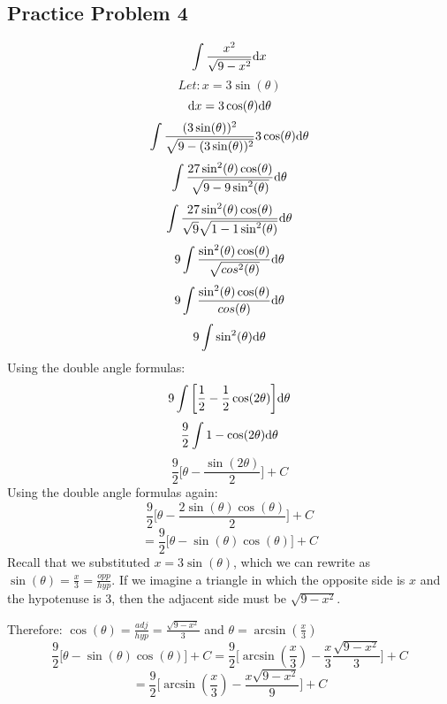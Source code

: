 \documentclass{math}
\begin{document}
\subsection*{Practice Problem 4}
\[ \int{\frac{x^{2}}{\sqrt{9-x^{2}}}\mathrm{d}{x}} \]
\[ Let: x = 3\sin(\theta) \]
\[ \mathrm{d}{x} = 3\cos(\theta)\mathrm{d}{\theta} \]
\[ \int{\frac{(3\sin(\theta))^{2}}
   {\sqrt{9-(3\sin(\theta))^{2}}}3\cos(\theta)\mathrm{d}{\theta}} \]
\[ \int{\frac{27\sin^{2}(\theta)\cos(\theta)}
   {\sqrt{9-9\sin^{2}(\theta)}}\mathrm{d}{\theta}} \]
\[ \int{\frac{27\sin^{2}(\theta)\cos(\theta)}
   {\sqrt{9}\sqrt{1-1\sin^{2}(\theta)}}\mathrm{d}{\theta}} \]
\[ 9\int{\frac{\sin^{2}(\theta)\cos(\theta)}
   {\sqrt{cos^{2}(\theta)}}\mathrm{d}{\theta}} \]
\[ 9\int{\frac{\sin^{2}(\theta)\cos(\theta)}{cos(\theta)}\mathrm{d}{\theta}} \]
\[ 9\int{\sin^{2}(\theta)\mathrm{d}{\theta}} \]
Using the double angle formulas:
\[ 9\int{\bigg[\frac{1}{2}-\frac{1}{2}\cos(2\theta)\bigg]\mathrm{d}{\theta}} \]
\[ \frac{9}{2}\int{1-\cos(2\theta)\mathrm{d}{\theta}} \]
\[ \frac{9}{2}\bigg[\theta-\frac{\sin(2\theta)}{2}\bigg]+C \]
Using the double angle formulas again:
\[ \frac{9}{2}\bigg[\theta-\frac{2\sin(\theta)\cos(\theta)}{2}\bigg]+C \]
\[ = \frac{9}{2}\bigg[\theta-\sin(\theta)\cos(\theta)\bigg]+C \]
Recall that we substituted \( x = 3\sin(\theta) \), which we can rewrite as
\( \sin(\theta) = \frac{x}{3} = \frac{opp}{hyp} \). If we imagine a triangle in
which the opposite side is \( x \) and the hypotenuse is 3, then the adjacent
side must be \( \sqrt{9-x^{2}} \).
\begin{center}
\end{center}
Therefore: \( \cos(\theta) = \frac{adj}{hyp} = \frac{\sqrt{9-x^{2}}}{3} \) and
\( \theta = \arcsin(\frac{x}{3}) \)
\[ \frac{9}{2}\bigg[\theta-\sin(\theta)\cos(\theta)\bigg]+C =
   \frac{9}{2}\bigg[\arcsin(\frac{x}{3})-
   \frac{x}{3}\frac{\sqrt{9-x^{2}}}{3}\bigg]+C \]
\[ = \frac{9}{2}\bigg[\arcsin(\frac{x}{3})-
   \frac{x\sqrt{9-x^{2}}}{9}\bigg]+C \]
\end{document}
